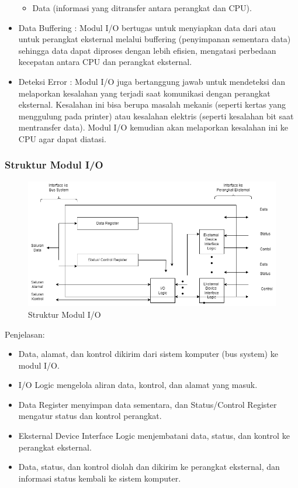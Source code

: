 \documentclass[12pt]{article}
\begin{document}
\begin{itemize}
\begin{itemize}
        \item Data (informasi yang ditransfer antara perangkat dan CPU).
    \end{itemize}
    \item Data Buffering : Modul I/O bertugas untuk menyiapkan data dari atau untuk perangkat eksternal melalui buffering (penyimpanan sementara data) sehingga data dapat diproses dengan lebih efisien, mengatasi perbedaan kecepatan antara CPU dan perangkat eksternal.
    \item Deteksi Error : Modul I/O juga bertanggung jawab untuk mendeteksi dan melaporkan kesalahan yang terjadi saat komunikasi dengan perangkat eksternal. Kesalahan ini bisa berupa masalah mekanis (seperti kertas yang menggulung pada printer) atau kesalahan elektris (seperti kesalahan bit saat mentransfer data). Modul I/O kemudian akan melaporkan kesalahan ini ke CPU agar dapat diatasi.
\end{itemize}
\subsubsection{Struktur Modul I/O}
\begin{figure}[h]
    \centering
    \includegraphics[width=0.80\linewidth]{b_class/asset/sisop.drawio.png}
    \caption{Struktur Modul I/O}
    \label{fig:enter-label}
\end{figure}
Penjelasan:
\begin{itemize}
    \item Data, alamat, dan kontrol dikirim dari sistem komputer (bus system) ke modul I/O.
    \item I/O Logic mengelola aliran data, kontrol, dan alamat yang masuk.
    \item Data Register menyimpan data sementara, dan Status/Control Register mengatur status dan kontrol perangkat.
    \item Eksternal Device Interface Logic menjembatani data, status, dan kontrol ke perangkat eksternal.
    \item Data, status, dan kontrol diolah dan dikirim ke perangkat eksternal, dan informasi status kembali ke sistem komputer.
\end{itemize}
\end{document}
